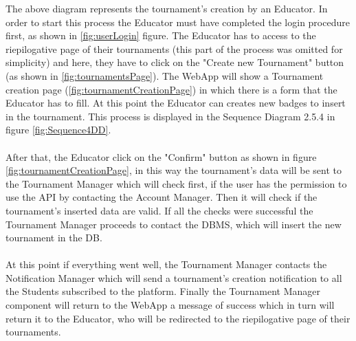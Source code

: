 \documentclass{article}
\begin{document}
{        The above diagram represents the tournament's creation by an Educator.
        In order to start this process the Educator must have completed the login procedure
        first, as shown in \ref{fig:userLogin} figure.
        The Educator has to access to the riepilogative page of their tournaments 
        (this part of the process was omitted for simplicity) and here, they have to click 
        on the "Create new Tournament" button (as shown in \ref{fig:tournamentsPage}).
        The WebApp will show a Tournament creation page (\ref{fig:tournamentCreationPage})
        in which there is a form that the Educator has to fill.
        At this point the Educator can creates new badges to insert in the tournament. This
        process is displayed in the Sequence Diagram 2.5.4 in figure \ref{fig:Sequence4DD}.
        \\ \\
        After that, the Educator click on the "Confirm" button as shown in figure 
        \ref{fig:tournamentCreationPage}, in this way the tournament's data will be sent to the
        Tournament Manager which will check first, if the user has the permission to use the API
        by contacting the Account Manager. Then it will check if the tournament's inserted data
        are valid. If all the checks were successful the Tournament Manager proceeds to
        contact the DBMS, which will insert the new tournament in the DB.
        \\ \\
        At this point if everything went well, the Tournament Manager contacts the Notification
        Manager which will send a tournament's creation notification to all the Students
        subscribed to the platform. 
        Finally the Tournament Manager component will return to the WebApp a message of success
        which in turn will return it to the Educator, who will be redirected to the 
        riepilogative page of their tournaments.

}
\end{document}
